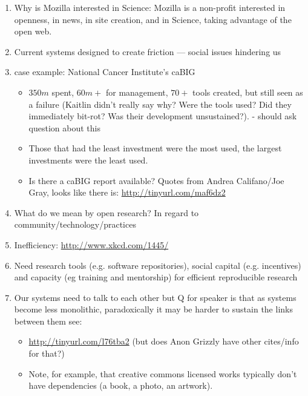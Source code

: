 \documentclass[11pt, oneside]{amsart}
\begin{document}
\begin{enumerate}
\item Why is Mozilla interested in Science: Mozilla is a non-profit interested
in openness, in news, in site creation, and in Science, taking advantage of the
open web.
\item Current systems designed to create friction --- social issues hindering us
\item case example: National Cancer Institute's caBIG
\begin{itemize}
\item $350m$ spent, $60m+$ for management, $70 + $ tools created, but still seen
as a failure (Kaitlin didn't really say why? Were the tools used? Did they
immediately bit-rot? Was their development unsustained?). - should ask question
about this
\item Those that had the least investment were the most used, the largest
investments were the least used.
\item Is there a caBIG report available? Quotes from Andrea Califano/Joe Gray,
looks like there is:
\url{http://tinyurl.com/maf6dz2}%
\end{itemize}

\item What do we mean by open research? In regard to
community/technology/practices
\item Inefficiency: \url{http://www.xkcd.com/1445/}
\item Need research tools (e.g. software repositories), social capital (e.g.
incentives) and capacity (eg training and mentorship) for efficient reproducible
research
\item Our systems need to talk to each other but Q for speaker is that as
systems become less monolithic, paradoxically it may be harder to sustain the
links between them see:
\begin{itemize}
\item
\url{http://tinyurl.com/l76tba2}%
(but does Anon Grizzly have other cites/info for that?)
\item Note, for example, that creative commons licensed works typically don't
have dependencies (a book, a photo, an artwork).
\end{itemize}


\end{enumerate}
\end{document}
